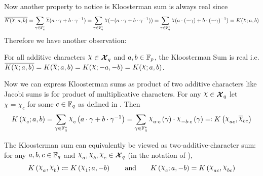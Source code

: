 Now another property to notice is Kloosterman sum is always real since $$\ov{K(\chi;a,b)}=\sum_{\gm\in\bbF_q^*}\ov{\chi}(a\cdot \gm+b\cdot \gm^{-1})= \sum_{\gm\in\bbF_q^*}\chi(-(a\cdot \gm+b\cdot \gm^{-1}))=\sum_{\gm\in\bbF_q^*}\chi(a\cdot (-\gm)+b\cdot (-\gm)^{-1})=K(\chi;a,b)$$
Therefore we have another observation:
\begin{observation}\label{obs:kloosterman-real}
  For all additive characters $\chi\in\Xq$ and $a,b\in\mathbb{F}_p$, the Kloosterman Sum is real i.e. $\ov{K(\chi;a,b)}=K(\ov{\chi};a,b)=K(\chi;-a,-b)=K(\chi;a,b)$. 
\end{observation}
Now we can express Kloosterman sums as product of two additive characters like Jacobi sums is for product of multiplicative characters. For any $\chi\in\Xq$ let $\chi=\chi_{c}$ for some $c\in\mathbb{F}_q$ as defined in \AddCharDefthm. Then $$K\lt(\chi_c;a,b\rt)=\sum_{\gm\in\bbF_q^*}\chi_c\lt(a\cdot \gm+b\cdot \gm^{-1}\rt)=\sum_{\gm\in\bbF_q^*}\chi_{a\cdot c}\lt(\gm\rt)\cdot \chi_{-b\cdot c}\lt(\gm\rt)\eqqcolon K\lt(\chi_{ac},\ov{\chi}_{bc}\rt)$$ 
\begin{observation}\label{obs:kloosterman-two-char-def}
  The Kloosterman sum can equivalently be viewed as two-additive-character sum: for any $a,b,c\in\mathbb{F}_q$ and $\chi_a,\chi_b,\chi_c\in\Xq$ (in the notation of \AddCharDefthm), $$K\lt(\chi_a,\chi_b\rt)\coloneqq K\lt(\chi_1;a,-b\rt)\qquad\text{and}\qquad K\lt(\chi_c;a,-b\rt)=K\lt(\chi_{ac},\chi_{bc}\rt)$$
\end{observation}

